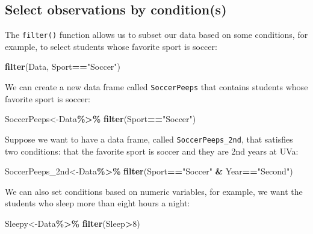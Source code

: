 \documentclass[
]{book}
\newenvironment{Shaded}{\begin{snugshade}}{\end{snugshade}}
\newcommand{\DecValTok}[1]{\textcolor[rgb]{0.00,0.00,0.81}{#1}}
\newcommand{\FunctionTok}[1]{\textcolor[rgb]{0.13,0.29,0.53}{\textbf{#1}}}
\newcommand{\NormalTok}[1]{#1}
\newcommand{\OtherTok}[1]{\textcolor[rgb]{0.56,0.35,0.01}{#1}}
\newcommand{\SpecialCharTok}[1]{\textcolor[rgb]{0.81,0.36,0.00}{\textbf{#1}}}
\newcommand{\StringTok}[1]{\textcolor[rgb]{0.31,0.60,0.02}{#1}}
\begin{document}
\hypertarget{select-observations-by-conditions-1}{%
\subsection{Select observations by condition(s)}\label{select-observations-by-conditions-1}}

The \texttt{filter()} function allows us to subset our data based on some conditions, for example, to select students whose favorite sport is soccer:

\begin{Shaded}
\begin{Highlighting}[]
\FunctionTok{filter}\NormalTok{(Data, Sport}\SpecialCharTok{==}\StringTok{"Soccer"}\NormalTok{)}
\end{Highlighting}
\end{Shaded}

We can create a new data frame called \texttt{SoccerPeeps} that contains students whose favorite sport is soccer:

\begin{Shaded}
\begin{Highlighting}[]
\NormalTok{SoccerPeeps}\OtherTok{\textless{}{-}}\NormalTok{Data}\SpecialCharTok{\%\textgreater{}\%}
  \FunctionTok{filter}\NormalTok{(Sport}\SpecialCharTok{==}\StringTok{"Soccer"}\NormalTok{)}
\end{Highlighting}
\end{Shaded}

Suppose we want to have a data frame, called \texttt{SoccerPeeps\_2nd}, that satisfies two conditions: that the favorite sport is soccer and they are 2nd years at UVa:

\begin{Shaded}
\begin{Highlighting}[]
\NormalTok{SoccerPeeps\_2nd}\OtherTok{\textless{}{-}}\NormalTok{Data}\SpecialCharTok{\%\textgreater{}\%}
  \FunctionTok{filter}\NormalTok{(Sport}\SpecialCharTok{==}\StringTok{"Soccer"} \SpecialCharTok{\&}\NormalTok{ Year}\SpecialCharTok{==}\StringTok{"Second"}\NormalTok{)}
\end{Highlighting}
\end{Shaded}

We can also set conditions based on numeric variables, for example, we want the students who sleep more than eight hours a night:

\begin{Shaded}
\begin{Highlighting}[]
\NormalTok{Sleepy}\OtherTok{\textless{}{-}}\NormalTok{Data}\SpecialCharTok{\%\textgreater{}\%}
  \FunctionTok{filter}\NormalTok{(Sleep}\SpecialCharTok{\textgreater{}}\DecValTok{8}\NormalTok{)}
\end{Highlighting}
\end{Shaded}
\end{document}
